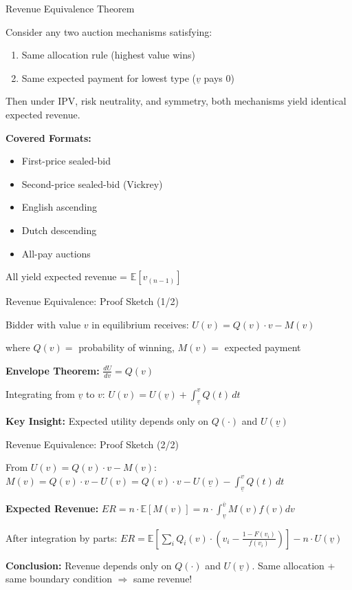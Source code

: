 \documentclass[xcolor={x11names}, aspectratio=169 ]{beamer}
\newcommand{\E}{\mathbb{E}}
\begin{document}
\begin{frame}{Revenue Equivalence Theorem}
\begin{theorem}
Consider any two auction mechanisms satisfying:
\begin{enumerate}
  \item Same allocation rule (highest value wins)
  \item Same expected payment for lowest type ($\underline{v}$ pays 0)
\end{enumerate}
Then under IPV, risk neutrality, and symmetry, both mechanisms yield identical expected revenue.
\end{theorem}

\textbf{Covered Formats:}
\begin{itemize}
  \item First-price sealed-bid
  \item Second-price sealed-bid (Vickrey)
  \item English ascending
  \item Dutch descending
  \item All-pay auctions
\end{itemize}

All yield expected revenue = $\E[v_{(n-1)}]$
\end{frame}

\begin{frame}{Revenue Equivalence: Proof Sketch (1/2)}
\begin{proofbox}
Bidder with value $v$ in equilibrium receives:
$U(v) = Q(v) \cdot v - M(v)$

where $Q(v) = $ probability of winning, $M(v) = $ expected payment

\textbf{Envelope Theorem:} $\frac{dU}{dv} = Q(v)$

Integrating from $\underline{v}$ to $v$:
$U(v) = U(\underline{v}) + \int_{\underline{v}}^{v} Q(t) \, dt$
\end{proofbox}

\textbf{Key Insight:} Expected utility depends only on $Q(\cdot)$ and $U(\underline{v})$
\end{frame}

\begin{frame}{Revenue Equivalence: Proof Sketch (2/2)}
\begin{proofbox}
From $U(v) = Q(v) \cdot v - M(v)$:
$M(v) = Q(v) \cdot v - U(v) = Q(v) \cdot v - U(\underline{v}) - \int_{\underline{v}}^{v} Q(t) \, dt$

\textbf{Expected Revenue:}
$ER = n \cdot \E[M(v)] = n \cdot \int_{\underline{v}}^{\bar{v}} M(v) f(v) dv$

After integration by parts:
$ER = \E\left[\sum_i Q_i(v) \cdot \left(v_i - \frac{1-F(v_i)}{f(v_i)}\right)\right] - n \cdot U(\underline{v})$
\end{proofbox}

\textbf{Conclusion:} Revenue depends only on $Q(\cdot)$ and $U(\underline{v})$. Same allocation + same boundary condition $\Rightarrow$ same revenue!
\end{frame}
\end{document}
